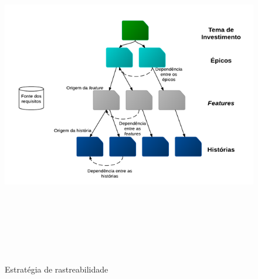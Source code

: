 \begin{figure}[!htb]
 \centering
 \includegraphics[width = 18cm, height = 15cm]{rastreabilidade}
 \caption{Estratégia de rastreabilidade}
 \label{fig:rastreabilidade}

\end{figure}